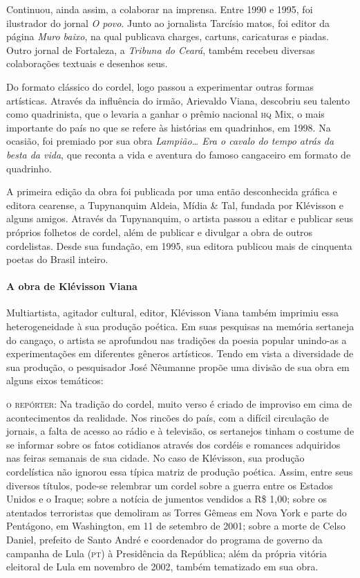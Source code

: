 \documentclass[11pt]{extarticle}
\begin{document}
Continuou, ainda assim, a colaborar na imprensa. Entre 1990 e 1995, foi ilustrador do jornal \textit{O povo}. Junto ao jornalista Tarcísio matos, foi editor da página \textit{Muro baixo}, na qual publicava charges, cartuns, caricaturas e piadas. Outro jornal de Fortaleza, a
\textit{Tribuna do Ceará}, também recebeu diversas colaborações textuais e desenhos seus.

Do formato clássico do cordel, logo passou a experimentar outras formas artísticas. Através da influência do irmão, Arievaldo Viana, descobriu seu talento como quadrinista, que o levaria a ganhar o prêmio nacional \textsc{hq} Mix, o mais importante do país no que se refere às histórias em quadrinhos, em 1998. Na ocasião, foi premiado por sua obra \textit{Lampião\ldots{} Era o cavalo do tempo atrás da besta da vida}, que reconta a vida e aventura do famoso cangaceiro em formato de quadrinho.

A primeira edição da obra foi publicada por uma então desconhecida gráfica e editora cearense, a Tupynanquim Aldeia, Mídia \& Tal, fundada por Klévisson e alguns amigos. Através da Tupynanquim, o artista passou a editar e publicar seus próprios folhetos de cordel, além de publicar e divulgar a obra de outros cordelistas. Desde sua fundação, em 1995, sua editora publicou mais de cinquenta poetas do Brasil inteiro.


\paragraph{A obra de Klévisson Viana}
Multiartista, agitador cultural, editor, Klévisson Viana também imprimiu essa heterogeneidade à sua produção poética. Em suas pesquisas na memória sertaneja do cangaço, o artista se aprofundou  nas tradições da poesia popular unindo-as a experimentações em diferentes gêneros artísticos. 
Tendo em vista a diversidade de sua produção, o pesquisador José Nêumanne propõe uma divisão de sua obra em alguns eixos temáticos:

\noindent\textsc{o repórter}: Na tradição do cordel, muito verso é criado de improviso em cima de acontecimentos da realidade. Nos rincões do país, com a difícil circulação de jornais, a falta de acesso ao rádio e à televisão, os sertanejos tinham o costume de se informar sobre os fatos cotidianos através dos cordéis e romances adquiridos nas feiras semanais de sua cidade.
No caso de Klévisson, sua produção cordelística não ignorou essa típica matriz de produção poética. Assim, entre seus diversos títulos, pode-se relembrar um cordel sobre a guerra entre os Estados Unidos e o Iraque; sobre a notícia de jumentos vendidos a R\$ 1,00; sobre 
os atentados terroristas que demoliram as Torres Gêmeas em Nova York e parte do Pentágono, em Washington, em 11 de setembro de 2001; sobre a morte de Celso Daniel, prefeito de Santo André e coordenador do programa de governo da campanha de Lula (\textsc{pt}) à Presidência da República; além da própria vitória eleitoral de Lula em novembro de 2002, também tematizado em sua obra.
\end{document}
